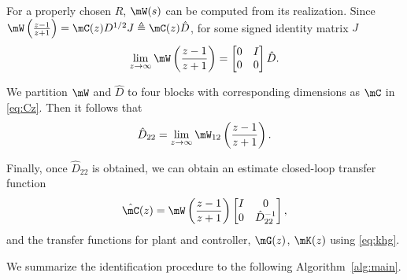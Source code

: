   For a properly chosen $R$, $\mW(s)$ can be computed from its realization. Since $\mW\left(\frac{z-1}{z+1}\right)=\mC(z)D^{1/2}J\triangleq \mC(z)\hat{D}$, for some signed identity matrix $J$ \cite{hayden}
  \begin{equation}
    \lim_{z\rightarrow\infty}\mW\left(\frac{z-1}{z+1}\right)=\begin{bmatrix} 0 & I \\
      0 & 0 
    \end{bmatrix} \hat{D}.
  \end{equation}

  We partition $\mW$ and $\hat{D}$ to four blocks with corresponding dimensions as $\mC$ in \eqref{eq:Cz}. Then it follows that 
  \begin{equation}\label{eq:D22}
    \hat{D}_{22}=\lim_{z\rightarrow\infty}\mW_{12}\left(\frac{z-1}{z+1}\right).
  \end{equation}

  Finally, once $\hat{D}_{22}$ is obtained, we can obtain an estimate closed-loop transfer function 
  \begin{equation}
  \label{eq:estC}
    \hat{\mC}(z)=\mW\left(\frac{z-1}{z+1}\right)\begin{bmatrix} I & 0 \\ 0 & \hat{D}^{-1}_{22}
    \end{bmatrix},
  \end{equation}
  and the transfer functions for plant and controller, $\mG(z)$, $\mK(z)$ using \eqref{eq:khg}.

  We summarize the identification procedure to the following Algorithm~\ref{alg:main}. 

